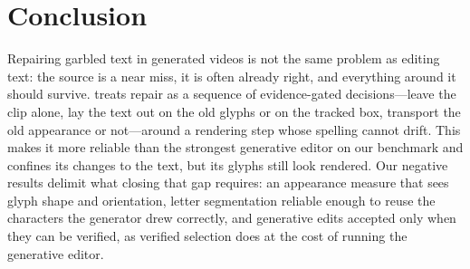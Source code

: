 \section{Conclusion}
\label{sec:conclusion}
Repairing garbled text in generated videos is not the same problem as editing text: the source is a near miss, it is often already right, and everything around it should survive. \method treats repair as a sequence of evidence-gated decisions---leave the clip alone, lay the text out on the old glyphs or on the tracked box, transport the old appearance or not---around a rendering step whose spelling cannot drift. This makes it more reliable than the strongest generative editor on our benchmark and confines its changes to the text, but its glyphs still look rendered. Our negative results delimit what closing that gap requires: an appearance measure that sees glyph shape and orientation, letter segmentation reliable enough to reuse the characters the generator drew correctly, and generative edits accepted only when they can be verified, as verified selection does at the cost of running the generative editor.

